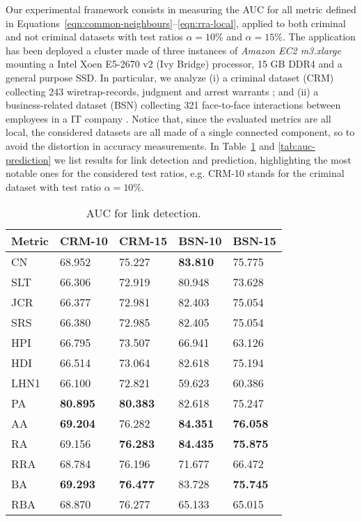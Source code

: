 Our experimental framework consists in measuring the AUC for all metric defined in Equations~\eqref{eqn:common-neighbours}--\eqref{eqn:rra-local}, applied to both criminal and not criminal datasets with test ratios $\alpha=10\%$ and $\alpha=15\%$.
%
The application has been deployed a cluster made of three instances of \textit{Amazon EC2 m3.xlarge} mounting a Intel Xoen E5-2670 v2 (Ivy Bridge) processor, 15 GB DDR4 and a general purpose SSD.
%
In particular, we analyze 
(i) a criminal dataset (CRM) collecting 243 wiretrap-records, judgment and arrest warrants \cite{berlusconi2016link}; and
(ii) a business-related dataset (BSN) collecting 321 face-to-face interactions between employees in a IT company \cite{olguin2009sensible}.
%
Notice that, since the evaluated metrics are all local, the considered datasets are all made of a single connected component, so to avoid the distortion in accuracy measurements.
%
In Table~\ref{tab:auc-detection} and \ref{tab:auc-prediction} we list results for link detection and prediction, highlighting the most notable ones for the considered test ratios, e.g. CRM-10 stands for the criminal dataset with test ratio $\alpha=10\%$.
%
\begin{table}[h]
	\centering
	\begin{tabular}{l l l l l}
	\toprule
	\textbf{Metric} & \textbf{CRM-10} & \textbf{CRM-15} & \textbf{BSN-10} & \textbf{BSN-15}\\
	\midrule
		CN   & 68.952 		   & 75.227 		 & \textbf{83.810} & 75.775 \\
		SLT  & 66.306 		   & 72.919 		 & 80.948 		   & 73.628 \\
		JCR  & 66.377 		   & 72.981 		 & 82.403 		   & 75.054 \\
		SRS  & 66.380 		   & 72.985 		 & 82.405 		   & 75.054 \\
		HPI  & 66.795 		   & 73.507 		 & 66.941 		   & 63.126 \\
		HDI  & 66.514 		   & 73.064 		 & 82.618 		   & 75.194 \\
		LHN1 & 66.100 		   & 72.821 		 & 59.623 		   & 60.386 \\
		PA   & \textbf{80.895} & \textbf{80.383} & 82.618 		   & 75.247 \\
		AA   & \textbf{69.204} & 76.282 		 & \textbf{84.351} & \textbf{76.058} \\
		RA   & 69.156 		   & \textbf{76.283} & \textbf{84.435} & \textbf{75.875} \\
		RRA  & 68.784 		   & 76.196 		 & 71.677 		   & 66.472 \\
		BA   & \textbf{69.293} & \textbf{76.477} & 83.728 		   & \textbf{75.745} \\
		RBA  & 68.870 		   & 76.277 		 & 65.133 		   & 65.015 \\
	\bottomrule
	\end{tabular}
	\caption{AUC for link detection.}
	\label{tab:auc-detection}
\end{table}
